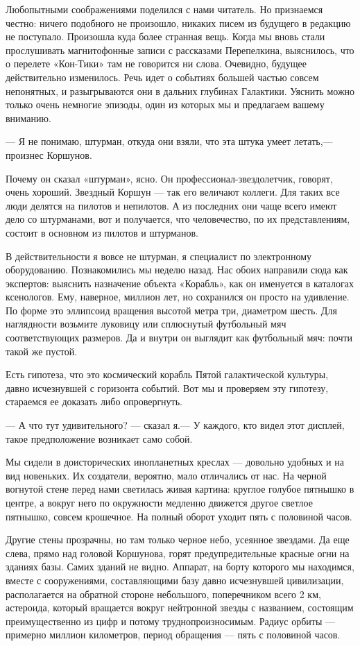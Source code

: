\documentclass[11pt,a4paper,oneside]{article}
\begin{document}
Любопытными соображениями поделился с нами читатель. Но признаемся честно: ничего подобного не произошло, никаких писем из будущего в редакцию не поступало. Произошла куда более странная вещь. Когда мы вновь стали прослушивать магнитофонные записи с рассказами Перепелкина, выяснилось, что о перелете «Кон-Тики» там не говорится ни слова. Очевидно, будущее действительно изменилось. Речь идет о событиях большей частью совсем непонятных, и разыгрываются они в дальних глубинах Галактики. Уяснить можно только очень немногие эпизоды, один из которых мы и предлагаем вашему вниманию.

— Я не понимаю, штурман, откуда они взяли, что эта штука умеет летать,— произнес Коршунов.

Почему он сказал «штурман», ясно. Он профессионал-звездолетчик, говорят, очень хороший. Звездный Коршун — так его величают коллеги. Для таких все люди делятся на пилотов и непилотов. А из последних они чаще всего имеют дело со штурманами, вот и получается, что человечество, по их представлениям, состоит в основном из пилотов и штурманов.

В действительности я вовсе не штурман, я специалист по электронному оборудованию. Познакомились мы неделю назад. Нас обоих направили сюда как экспертов: выяснить назначение объекта «Корабль», как он именуется в каталогах ксенологов. Ему, наверное, миллион лет, но сохранился он просто на удивление. По форме это эллипсоид вращения высотой метра три, диаметром шесть. Для наглядности возьмите луковицу или сплюснутый футбольный мяч соответствующих размеров. Да и внутри он выглядит как футбольный мяч: почти такой же пустой.

Есть гипотеза, что это космический корабль Пятой галактической культуры, давно исчезнувшей с горизонта событий. Вот мы и проверяем эту гипотезу, стараемся ее доказать либо опровергнуть.

— А что тут удивительного? — сказал я.— У каждого, кто видел этот дисплей, такое предположение возникает само собой.

Мы сидели в доисторических инопланетных креслах — довольно удобных и на вид новеньких. Их создатели, вероятно, мало отличались от нас. На черной вогнутой стене перед нами светилась живая картина: круглое голубое пятнышко в центре, а вокруг него по окружности медленно движется другое светлое пятнышко, совсем крошечное. На полный оборот уходит пять с половиной часов.

Другие стены прозрачны, но там только черное небо, усеянное звездами. Да еще слева, прямо над головой Коршунова, горят предупредительные красные огни на зданиях базы. Самих зданий не видно. Аппарат, на борту которого мы находимся, вместе с сооружениями, составляющими базу давно исчезнувшей цивилизации, располагается на обратной стороне небольшого, поперечником всего 2 км, астероида, который вращается вокруг нейтронной звезды с названием, состоящим преимущественно из цифр и потому труднопроизносимым. Радиус орбиты — примерно миллион километров, период обращения — пять с половиной часов.
\end{document}
